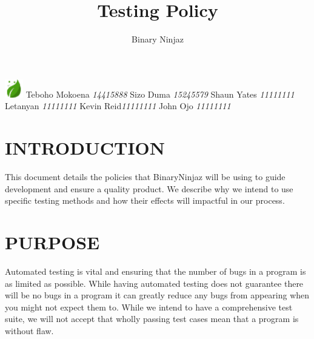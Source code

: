 \documentclass[12pt]{article}
\title{Testing Policy}
\author{Binary Ninjaz}
\date{}
\begin{document}
  \maketitle

\begin{flushright} \large
\includegraphics[width=30px]{leaf2}\emph{} \newline\newline 
Teboho Mokoena \emph{14415888} \newline
Sizo Duma \emph{15245579} \newline
Shaun Yates 	\emph{11111111} \newline
Letanyan  \emph{11111111} \newline
Kevin Reid\emph{11111111} \newline
John Ojo \emph{11111111} \newline
\end{flushright}
  \newpage
  
  \tableofcontents
  \newpage
  
  \section{INTRODUCTION}
  This document details the policies that BinaryNinjaz will be using to guide development and ensure a quality product. We describe why we intend to use specific testing methods and how their effects will impactful in our process. 
  
  \section{PURPOSE}
  Automated testing is vital and ensuring that the number of bugs in a program is as limited as possible. While having automated testing does not guarantee there will be no bugs in a program it can greatly reduce any bugs from appearing when you might not expect them to. While we intend to have a comprehensive test suite, we will not accept that wholly passing test cases mean that a program is without flaw.
\end{document}
